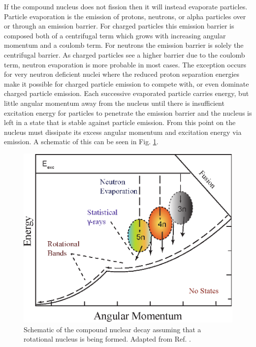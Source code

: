 If the compound nucleus does not fission then it will instead evaporate particles. Particle evaporation is the emission of protons, neutrons, or alpha particles over or through an emission barrier. For charged particles this emission barrier is composed both of a centrifugal term which grows with increasing angular momentum and a coulomb term. For neutrons the emission barrier is solely the centrifugal barrier. As charged particles see a higher barrier due to the coulomb term, neutron evaporation is more probable in most cases. The exception occurs for very neutron deficient nuclei where the reduced proton separation energies make it possible for charged particle emission to compete with, or even dominate charged particle emission. Each successive evaporated particle carries energy, but little angular momentum away from the nucleus until there is insufficient excitation energy for particles to penetrate the emission barrier and the nucleus is left in a state that is stable against particle emission. From this point on the nucleus must dissipate its excess angular momentum and excitation energy via \gr{} emission. A schematic of this can be seen in Fig. \ref{fig:chp3-emission-schematic}.

\begin{figure}[h!]
	\centerline{\includegraphics[height=0.3\textheight]{./img/c3/evaporation_chans.eps}}
	\caption{Schematic of the compound nuclear decay assuming that a rotational nucleus is being formed. Adapted from Ref. \cite{danielDissertation}.}
	\label{fig:chp3-emission-schematic}
\end{figure}

